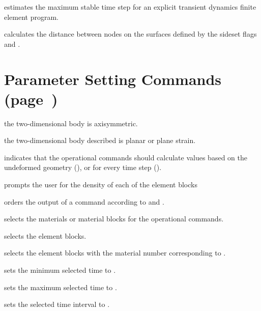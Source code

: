  {
estimates the maximum stable time step for an explicit transient
dynamics finite element program. 
}

 {
calculates the distance between nodes on the surfaces defined
by the sideset flags  and .  
}

\newpage
\section{Parameter Setting Commands (page~\protect\pageref{sec:param})}

 {
the two-dimensional body is axisymmetric.  
}

 {
the two-dimensional body described is planar or plane strain. 
}

 {
indicates that the operational commands should calculate values based on
the undeformed geometry (), or for every time step (). 
}

 {
prompts the user for the density of each of the element blocks 
}

 {
orders the output of a  command according to
 and . 
}

 {
selects the materials or material blocks for the operational commands. 
}

 {
selects the element blocks. 
} 

 {
selects the element blocks with the material number corresponding to
.  
}

 {
sets the minimum selected time to .
}

 {
sets the maximum selected time to .
}

 {
sets the selected time interval to .
}

